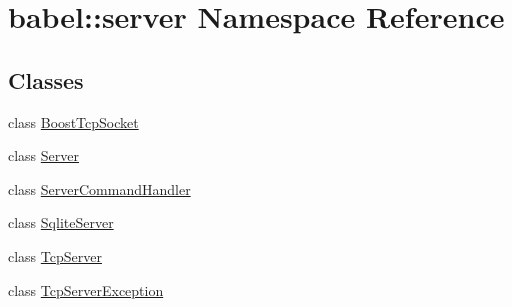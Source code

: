 \hypertarget{namespacebabel_1_1server}{}\section{babel\+:\+:server Namespace Reference}
\label{namespacebabel_1_1server}
\subsection*{Classes}
\begin{DoxyCompactItemize}
\item 
class \mbox{\hyperlink{classbabel_1_1server_1_1_boost_tcp_socket}{Boost\+Tcp\+Socket}}
\item 
class \mbox{\hyperlink{classbabel_1_1server_1_1_server}{Server}}
\item 
class \mbox{\hyperlink{classbabel_1_1server_1_1_server_command_handler}{Server\+Command\+Handler}}
\item 
class \mbox{\hyperlink{classbabel_1_1server_1_1_sqlite_server}{Sqlite\+Server}}
\item 
class \mbox{\hyperlink{classbabel_1_1server_1_1_tcp_server}{Tcp\+Server}}
\item 
class \mbox{\hyperlink{classbabel_1_1server_1_1_tcp_server_exception}{Tcp\+Server\+Exception}}
\end{DoxyCompactItemize}
